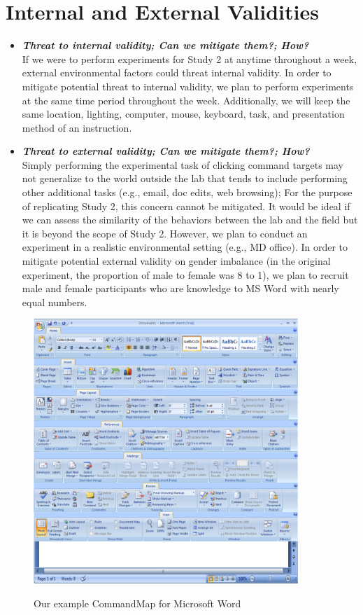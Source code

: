 \documentclass{article}
\begin{document}
\section*{Internal and External Validities}  
\begin{itemize}
   \item \textbf{\textit{Threat to internal validity; Can we mitigate them?; How?}} \\
   If we were to perform experiments for Study 2 at anytime throughout a week, external environmental factors could threat internal validity. In order to mitigate potential threat to internal validity, we plan to perform experiments at the same time period throughout the week. Additionally, we will keep the same location, lighting, computer, mouse, keyboard, task, and presentation method of an instruction. 
   \item \textbf{\textit{Threat to external validity; Can we mitigate them?; How?}} \\
   Simply performing the experimental task of clicking command targets may not generalize to the world outside the lab that tends to include performing other additional tasks (e.g., email, doc edits, web browsing); For the purpose of replicating Study 2, this concern cannot be mitigated. It would be ideal if we can assess the similarity of the behaviors between the lab and the field but it is beyond the scope of Study 2.  However, we plan to conduct an experiment in a realistic environmental setting (e.g., MD office). In order to mitigate potential external validity on gender imbalance (in the original experiment, the proportion of male to female was 8 to 1), we plan to recruit male and female participants who are knowledge to MS Word with nearly equal numbers. 
   \end{itemize} 
   
\begin{figure}[tbh]
  \centering
  \includegraphics[width=100mm]{command_layout1}\\
  \caption{Our example CommandMap for Microsoft Word}
  \label{fig:ex_commandmap}
\end{figure}
\pagebreak
\end{document}

